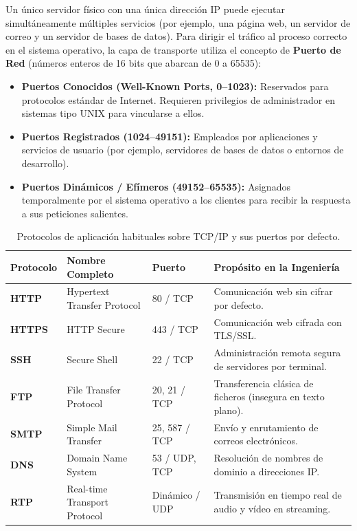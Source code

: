 Un único servidor físico con una única dirección IP puede ejecutar simultáneamente múltiples servicios (por ejemplo, una página web, un servidor de correo y un servidor de bases de datos). Para dirigir el tráfico al proceso correcto en el sistema operativo, la capa de transporte utiliza el concepto de \textbf{Puerto de Red} (números enteros de 16 bits que abarcan de 0 a 65535):

\begin{itemize}[leftmargin=1.2cm]
  \item \textbf{Puertos Conocidos (Well-Known Ports, 0--1023):} Reservados para protocolos estándar de Internet. Requieren privilegios de administrador en sistemas tipo UNIX para vincularse a ellos.
  \item \textbf{Puertos Registrados (1024--49151):} Empleados por aplicaciones y servicios de usuario (por ejemplo, servidores de bases de datos o entornos de desarrollo).
  \item \textbf{Puertos Dinámicos / Efímeros (49152--65535):} Asignados temporalmente por el sistema operativo a los clientes para recibir la respuesta a sus peticiones salientes.
\end{itemize}

\begin{table}[htbp]
\centering
\caption{Protocolos de aplicación habituales sobre TCP/IP y sus puertos por defecto.}
\label{tab:protocolos-puertos}
\begin{tabularx}{\textwidth}{l p{2.2cm} l X}
\toprule
\textbf{Protocolo} & \textbf{Nombre Completo} & \textbf{Puerto} & \textbf{Propósito en la Ingeniería} \\
\midrule
\textbf{HTTP} & Hypertext Transfer Protocol & 80 / TCP & Comunicación web sin cifrar por defecto. \\
\textbf{HTTPS} & HTTP Secure & 443 / TCP & Comunicación web cifrada con TLS/SSL. \\
\textbf{SSH} & Secure Shell & 22 / TCP & Administración remota segura de servidores por terminal. \\
\textbf{FTP} & File Transfer Protocol & 20, 21 / TCP & Transferencia clásica de ficheros (insegura en texto plano). \\
\textbf{SMTP} & Simple Mail Transfer & 25, 587 / TCP & Envío y enrutamiento de correos electrónicos. \\
\textbf{DNS} & Domain Name System & 53 / UDP, TCP & Resolución de nombres de dominio a direcciones IP. \\
\textbf{RTP} & Real-time Transport Protocol & Dinámico / UDP & Transmisión en tiempo real de audio y vídeo en streaming. \\
\bottomrule
\end{tabularx}
\end{table}

